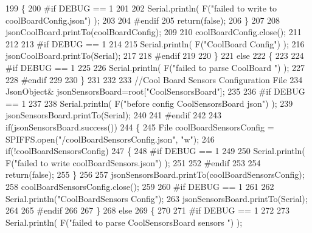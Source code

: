 \begin{DoxyCode}
199         \{   
200 \textcolor{preprocessor}{        #if DEBUG == 1}
201             
202             Serial.println( F(\textcolor{stringliteral}{"failed to write to coolBoardConfig.json"}) );
203 
204 \textcolor{preprocessor}{        #endif}
205             \textcolor{keywordflow}{return}(\textcolor{keyword}{false});
206         \}
207         
208         jsonCoolBoard.printTo(coolBoardConfig);
209         
210         coolBoardConfig.close();
211 
212 
213 \textcolor{preprocessor}{    #if DEBUG == 1}
214 
215         Serial.println( F(\textcolor{stringliteral}{"CoolBoard Config"}) );
216         jsonCoolBoard.printTo(Serial);
217     
218 \textcolor{preprocessor}{    #endif}
219         
220     \}
221     \textcolor{keywordflow}{else}
222     \{
223     
224 \textcolor{preprocessor}{    #if DEBUG == 1 }
225 
226         Serial.println( F(\textcolor{stringliteral}{"failed to parse CoolBoard "}) );
227     
228 \textcolor{preprocessor}{    #endif}
229 
230     \}       
231 
232     
233     \textcolor{comment}{//Cool Board Sensors Configuration File}
234         JsonObject& jsonSensorsBoard=root[\textcolor{stringliteral}{"CoolSensorsBoard"}];
235 
236 \textcolor{preprocessor}{#if DEBUG == 1 }
237 
238     Serial.println( F(\textcolor{stringliteral}{"before config CoolSensorsBoard json"}) );
239     jsonSensorsBoard.printTo(Serial);
240 
241 \textcolor{preprocessor}{#endif }
242     
243     \textcolor{keywordflow}{if}(jsonSensorsBoard.success())
244     \{   
245         File coolBoardSensorsConfig = SPIFFS.open(\textcolor{stringliteral}{"/coolBoardSensorsConfig.json"}, \textcolor{stringliteral}{"w"}); 
246         \textcolor{keywordflow}{if}(!coolBoardSensorsConfig)
247         \{
248 \textcolor{preprocessor}{        #if DEBUG == 1 }
249         
250             Serial.println( F(\textcolor{stringliteral}{"failed to write coolBoardSensors.json"}) );
251 
252 \textcolor{preprocessor}{        #endif}
253 
254             \textcolor{keywordflow}{return}(\textcolor{keyword}{false});
255         \}
256         
257         jsonSensorsBoard.printTo(coolBoardSensorsConfig);
258         coolBoardSensorsConfig.close();
259 
260 \textcolor{preprocessor}{    #if DEBUG == 1}
261 
262         Serial.println(\textcolor{stringliteral}{"CoolBoardSensors Config"});
263         jsonSensorsBoard.printTo(Serial);
264 
265 \textcolor{preprocessor}{    #endif}
266 
267     \}
268     \textcolor{keywordflow}{else}
269     \{
270 
271 \textcolor{preprocessor}{    #if DEBUG == 1}
272 
273         Serial.println( F(\textcolor{stringliteral}{"failed to parse CoolSensorsBoard sensors "}) );   

\end{DoxyCode}
